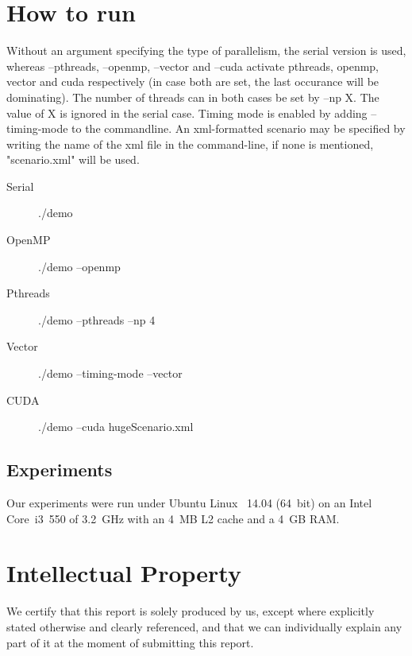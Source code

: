 \documentclass[a4paper,11pt]{article}
\begin{document}
\section{How to run}
Without an argument specifying the type of parallelism, the serial version is used, whereas --pthreads, --openmp, --vector and --cuda activate pthreads, openmp, vector and cuda respectively (in case both are set, the last occurance will be dominating). The number of threads can in both cases be set by --np X. The value of X is ignored in the serial case. Timing mode is enabled by adding --timing-mode to the commandline. An xml-formatted scenario may be specified by writing the name of the xml file in the command-line, if none is mentioned, "scenario.xml" will be used.
\begin{description}
    \item[Serial] ./demo
    \item[OpenMP] ./demo --openmp
    \item[Pthreads] ./demo --pthreads --np 4
    \item[Vector] ./demo --timing-mode --vector
    \item[CUDA] ./demo --cuda hugeScenario.xml
\end{description}
   
\subsection{Experiments}
Our experiments were run under Ubuntu Linux ~14.04 (64~bit) on an
Intel Core~i3~550 of 3.2~GHz with an 4~MB L2 cache and a 4~GB RAM.



\section*{Intellectual Property}
We certify that this report is solely produced by us, except where
explicitly stated otherwise and clearly referenced, and that we can
individually explain any part of it at the moment of submitting this
report.
\end{document}
